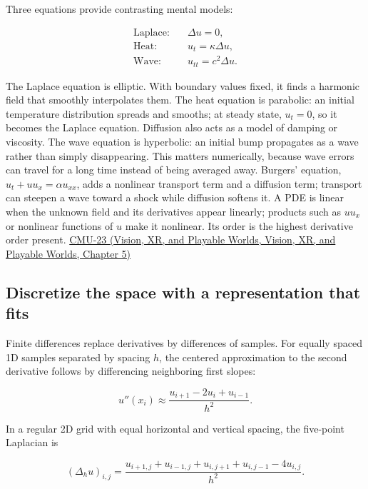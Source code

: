 Three equations provide contrasting mental models:

\[
\begin{aligned}
\text{Laplace:}\quad &\Delta u=0,\\
\text{Heat:}\quad &u_t=\kappa\Delta u,\\
\text{Wave:}\quad &u_{tt}=c^2\Delta u.
\end{aligned}
\]

The Laplace equation is elliptic. With boundary values fixed, it finds a harmonic field that smoothly interpolates them. The heat equation is parabolic: an initial temperature distribution spreads and smooths; at steady state, \(u_t=0\), so it becomes the Laplace equation. Diffusion also acts as a model of damping or viscosity. The wave equation is hyperbolic: an initial bump propagates as a wave rather than simply disappearing. This matters numerically, because wave errors can travel for a long time instead of being averaged away. Burgers' equation, \(u_t+u u_x=\alpha u_{xx}\), adds a nonlinear transport term and a diffusion term; transport can steepen a wave toward a shock while diffusion softens it. A PDE is linear when the unknown field and its derivatives appear linearly; products such as \(u u_x\) or nonlinear functions of \(u\) make it nonlinear. Its order is the highest derivative order present. \href{../07-Vision-XR-and-Playable-Worlds/main.pdf\#nameddest=04-visual-computing-ii-ch036-cmu-23---physically-based-animation-and-pdes}{CMU-23 (Vision, XR, and Playable Worlds, Vision, XR, and Playable Worlds, Chapter 5)}

\subsection{Discretize the space with a representation that fits}\label{04-visual-computing-ii-ch030-discretize-the-space-with-a-representation-that-fits}

Finite differences replace derivatives by differences of samples. For equally spaced 1D samples separated by spacing \(h\), the centered approximation to the second derivative follows by differencing neighboring first slopes:

\[
u''(x_i)\approx\frac{u_{i+1}-2u_i+u_{i-1}}{h^2}.
\]

In a regular 2D grid with equal horizontal and vertical spacing, the five-point Laplacian is

\[
(\Delta_h u)_{i,j}=\frac{u_{i+1,j}+u_{i-1,j}+u_{i,j+1}+u_{i,j-1}-4u_{i,j}}{h^2}.
\]

